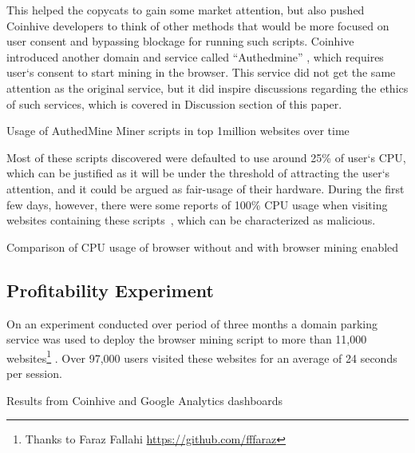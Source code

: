 This helped the copycats to gain some market attention, but also pushed Coinhive developers to think of other methods that would be more focused on user consent and bypassing blockage for running such scripts. Coinhive introduced another domain and service called ``Authedmine'' , which requires user`s consent to start mining in the browser. This service did not get the same attention as the original service, but it did inspire discussions regarding the ethics of such services, which is covered in Discussion section of this paper. 
\begin{center}
	\caption{Usage of AuthedMine Miner scripts in top 1million websites over time}
\end{center}

Most of these scripts discovered were defaulted to use around 25\% of user`s CPU, which can be justified as it will be under the threshold of attracting the user`s attention, and it could be argued as fair-usage of their hardware. During the first few days, however, there were some reports of 100\% CPU usage when visiting websites containing these scripts~\cite{piratesbayblog}, which can be characterized as malicious.

\begin{center}
	\caption{Comparison of CPU usage of browser without and with browser mining enabled}
\end{center}

\subsection{\textbf{Profitability Experiment}}
\label{profitabilitexperiment}
On an experiment conducted over period of three months a domain parking service was used to deploy the browser mining script to more than 11,000 websites\footnote{Thanks to Faraz Fallahi \url{https://github.com/fffaraz}} . Over 97,000 users visited these websites for an average of 24 seconds per session.

\begin{center}
	\caption{Results from Coinhive and Google Analytics dashboards}
\end{center}

